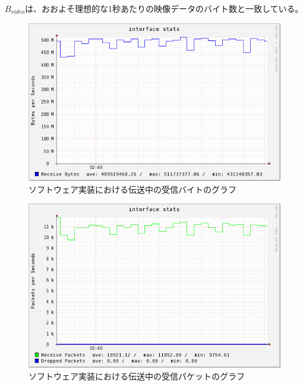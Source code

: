 $B_{video}$は、おおよそ理想的な1秒あたりの映像データのバイト数と一致している。

\begin{figure}[htbp]
  \begin{center}
    \includegraphics[bb=0 0 597 374,width=11.8cm]{img/lo-bytes-graph.png}
  \end{center}
  \caption{ソフトウェア実装における伝送中の受信バイトのグラフ}
  \label{fig:lo-bytes-graph}
\end{figure}

\begin{figure}[htbp]
  \begin{center}
    \includegraphics[bb=0 0 597 388,width=11.8cm]{img/lo-packets-graph.png}
  \end{center}
  \caption{ソフトウェア実装における伝送中の受信パケットのグラフ}
  \label{fig:lo-packets-graph}
\end{figure}

